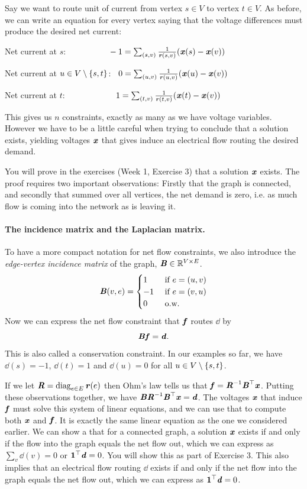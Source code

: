 Say we want to route unit of current from vertex $s \in V$ to vertex
$t \in V$.
As before, we can write an equation for every vertex saying that the
voltage differences must produce the desired net current:
\begin{tight_itemize}
\item Net current at $s$:
  $\phantom{----,,,}-1 = \sum_{(s,v)} \frac{1}{\boldsymbol{\mathit{r}}(s,v)} (\boldsymbol{\mathit{x}}(s) - \boldsymbol{\mathit{x}}(v))$
\item Net current at $u \in V\setminus\left\{s,t \right\}$:
  $\phantom{..} 0 = \sum_{(u,v)} \frac{1}{\boldsymbol{\mathit{r}}(u,v)} (\boldsymbol{\mathit{x}}(u) - \boldsymbol{\mathit{x}}(v))$
\item Net current at  $t$:  $\phantom{------,} 1=\sum_{(t,v)} \frac{1}{\boldsymbol{\mathit{r}}(t,v)} (\boldsymbol{\mathit{x}}(t) - \boldsymbol{\mathit{x}}(v))$
\end{tight_itemize}
This gives us $n$ constraints, exactly as many as we have voltage
variables.
However we have to be a little careful when trying to conclude that a
solution exists, yielding voltages $\boldsymbol{\mathit{x}}$ that gives induce an
electrical flow routing the desired demand.


You will prove in the exercises (Week 1, Exercise 3) that a solution $\boldsymbol{\mathit{x}}$ exists. The proof requires two
important observations: Firstly that the graph is connected, and
secondly that summed over all vertices, the net demand is zero,
i.e. as much flow is coming into the network as is leaving it.

\paragraph{The incidence matrix and the Laplacian matrix.}
To have a more compact notation for net flow constraints, we also
introduce the \emph{edge-vertex incidence matrix} of the graph,
$\boldsymbol{\mathit{B}} \in \mathbb{R}^{V \times E}$.
\[
  \boldsymbol{\mathit{B}}(v,e) =
  \begin{cases}
    1 & \text{ if } e = (u,v) \\
    -1 &\text{ if } e = (v,u) \\
    0 &\text{ o.w.}
  \end{cases}
\]
%
Now we can express the net flow constraint that $\boldsymbol{\mathit{f}}$ routes $\dd$ by
\[
  \boldsymbol{\mathit{B}} \boldsymbol{\mathit{f}} = \boldsymbol{\mathit{d}}
  .
\]
This is also called a conservation constraint. In our examples so far,
we have $\dd(s) = -1$, $\dd(t) = 1$ and $\dd(u) = 0$ for all $u\in V\setminus\left\{s,t \right\}$.

If we let $\boldsymbol{\mathit{R}} = \operatorname*{diag}_{e \in E} \boldsymbol{\mathit{r}}(e)$
then Ohm's law tells us that $\boldsymbol{\mathit{f}} = \boldsymbol{\mathit{R}}^{-1}\boldsymbol{\mathit{B}}^{\top} \boldsymbol{\mathit{x}}$.
Putting these observations together, we have $\boldsymbol{\mathit{B}} \boldsymbol{\mathit{R}}^{-1}\boldsymbol{\mathit{B}}^{\top}
\boldsymbol{\mathit{x}}= \boldsymbol{\mathit{d}}$.
The voltages $\boldsymbol{\mathit{x}}$ that induce $\boldsymbol{\mathit{f}}$ must solve this system of linear
equations, and we can use that to compute both $\boldsymbol{\mathit{x}}$ and $\boldsymbol{\mathit{f}}$.
It is exactly the same linear
equation as the one we considered earlier.
We can show a that for a connected graph, a solution $\boldsymbol{\mathit{x}}$
exists if and only if the
flow into the graph equals the net flow out, which we can express as
$\sum_{v} \dd(v) = 0$ or $\boldsymbol{1}^\top \boldsymbol{\mathit{d}} = 0$.
You will show this as part of Exercise 3.
This also implies that an electrical flow routing
$\dd$ exists if and only if the net
flow into the graph equals the net flow out, which we can express as
$\boldsymbol{1}^\top \boldsymbol{\mathit{d}} = 0$.


